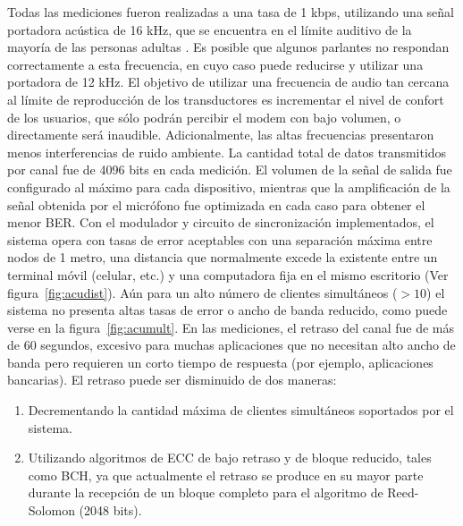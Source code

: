 Todas las mediciones fueron realizadas a una tasa de 1 kbps, utilizando una señal portadora acústica de 16 kHz, que se encuentra en el límite auditivo de la mayoría de las personas adultas \cite{gordon2005hearing}. Es posible que algunos parlantes no respondan correctamente a esta frecuencia, en cuyo caso puede reducirse y utilizar una portadora de 12 kHz. El objetivo de utilizar una frecuencia de audio tan cercana al límite de reproducción de los transductores es incrementar el nivel de confort de los usuarios, que sólo podrán percibir el modem con bajo volumen, o directamente será inaudible. Adicionalmente, las altas frecuencias presentaron menos interferencias de ruido ambiente.
La cantidad total de datos transmitidos por canal fue de 4096 bits en cada medición. El volumen de la señal de salida fue configurado al máximo para cada dispositivo, mientras que la amplificación de la señal obtenida por el micrófono fue optimizada en cada caso para obtener el menor BER.
Con el modulador y circuito de sincronización implementados, el sistema opera con tasas de error aceptables con una separación máxima entre nodos de 1 metro, una distancia que normalmente excede la existente entre un terminal móvil (celular, etc.) y una computadora fija en el mismo escritorio (Ver figura~\ref{fig:acudist}). Aún para un alto número de clientes simultáneos ($> 10$) el sistema no presenta altas tasas de error o ancho de banda reducido, como puede verse en la figura~\ref{fig:acumult}.
En las mediciones, el retraso del canal fue de más de 60 segundos, excesivo para muchas aplicaciones que no necesitan alto ancho de banda pero requieren un corto tiempo de respuesta (por ejemplo, aplicaciones bancarias). El retraso puede ser disminuido de dos maneras: 
\begin{enumerate}
 \item Decrementando la cantidad máxima de clientes simultáneos soportados por el sistema.
 \item Utilizando algoritmos de ECC de bajo retraso y de bloque reducido, tales como BCH, ya que actualmente el retraso se produce en su mayor parte durante la recepción de un bloque completo para el algoritmo de Reed-Solomon (2048 bits).
\end{enumerate}



